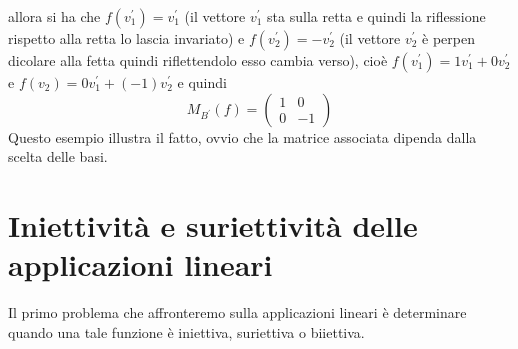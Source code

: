 \begin{esempio}
\begin{enumerate}
\begin{figure}[th]
    \end{figure}
    allora si ha che $f(v_1^\prime)=v_1^\prime$ (il vettore $v_1^\prime$ sta sulla retta e quindi
    la riflessione rispetto alla retta lo lascia invariato) e $f(v^\prime_2)=-v^\prime_2$ (il
    vettore $v_2^\prime$ è perpen dicolare alla fetta quindi riflettendolo esso cambia verso),
    cioè $f(v_1^\prime)=1v^\prime_1+0v^\prime_2$ e $f(v_2)=0v_1^\prime+(-1)v_2^\prime$ e quindi
     \begin{equation*}
      M_{B^\prime}(f)=
      \begin{pmatrix}
        1 & 0\\
        0 & -1
      \end{pmatrix}
    \end{equation*}
    Questo esempio illustra il fatto, ovvio che la matrice associata dipenda dalla scelta delle
    basi.
  \end{enumerate}
\end{esempio}

\section{Iniettività e suriettività delle applicazioni lineari}
\label{sec:inie_surie_app_lin}
Il primo problema che affronteremo sulla applicazioni lineari è determinare quando una tale
funzione è iniettiva, suriettiva o biiettiva.

